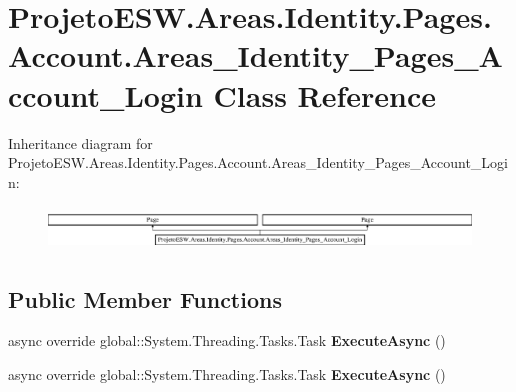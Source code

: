 \hypertarget{class_projeto_e_s_w_1_1_areas_1_1_identity_1_1_pages_1_1_account_1_1_areas___identity___pages___account___login}{}\section{Projeto\+E\+S\+W.\+Areas.\+Identity.\+Pages.\+Account.\+Areas\+\_\+\+Identity\+\_\+\+Pages\+\_\+\+Account\+\_\+\+Login Class Reference}
\label{class_projeto_e_s_w_1_1_areas_1_1_identity_1_1_pages_1_1_account_1_1_areas___identity___pages___account___login}
Inheritance diagram for Projeto\+E\+S\+W.\+Areas.\+Identity.\+Pages.\+Account.\+Areas\+\_\+\+Identity\+\_\+\+Pages\+\_\+\+Account\+\_\+\+Login\+:\begin{figure}[H]
\begin{center}
\leavevmode
\includegraphics[height=1.171548cm]{class_projeto_e_s_w_1_1_areas_1_1_identity_1_1_pages_1_1_account_1_1_areas___identity___pages___account___login}
\end{center}
\end{figure}
\subsection*{Public Member Functions}
\begin{DoxyCompactItemize}
\item 
\mbox{\label{class_projeto_e_s_w_1_1_areas_1_1_identity_1_1_pages_1_1_account_1_1_areas___identity___pages___account___login_a7e90aae0ee10512d7d9e7140e1edb17b}} 
async override global\+::\+System.\+Threading.\+Tasks.\+Task {\bfseries Execute\+Async} ()
\item 
\mbox{\label{class_projeto_e_s_w_1_1_areas_1_1_identity_1_1_pages_1_1_account_1_1_areas___identity___pages___account___login_a7e90aae0ee10512d7d9e7140e1edb17b}} 
async override global\+::\+System.\+Threading.\+Tasks.\+Task {\bfseries Execute\+Async} ()
\end{DoxyCompactItemize}
